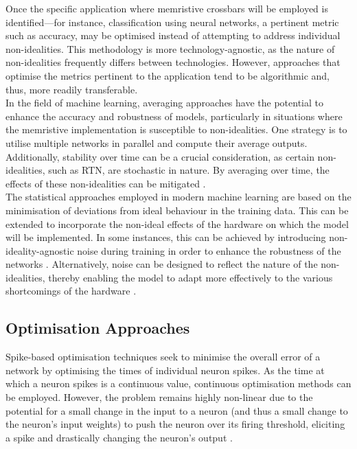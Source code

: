 \noindent Once the specific application where memristive crossbars will be employed is identified—for instance, classification using neural networks, a pertinent metric such as accuracy, may be optimised instead of attempting to address individual non-idealities. This methodology is more technology-agnostic, as the nature of non-idealities frequently differs between technologies. However, approaches that optimise the metrics pertinent to the application tend to be algorithmic and, thus, more readily transferable.\\

\noindent In the field of machine learning, averaging approaches have the potential to enhance the accuracy and robustness of models, particularly in situations where the memristive implementation is susceptible to non-idealities. One strategy is to utilise multiple networks in parallel and compute their average outputs. Additionally, stability over time can be a crucial consideration, as certain non-idealities, such as RTN, are stochastic in nature. By averaging over time, the effects of these non-idealities can be mitigated \cite{wan2020voltage}.\\

\noindent The statistical approaches employed in modern machine learning are based on the minimisation of deviations from ideal behaviour in the training data. This can be extended to incorporate the non-ideal effects of the hardware on which the model will be implemented. In some instances, this can be achieved by introducing non-ideality-agnostic noise during training in order to enhance the robustness of the networks \cite{ye2023improving}. Alternatively, noise can be designed to reflect the nature of the non-idealities, thereby enabling the model to adapt more effectively to the various shortcomings of the hardware \cite{huang2021method}.

\subsection[Optimisation Approaches]{Optimisation Approaches}

Spike-based optimisation techniques seek to minimise the overall error of a network by optimising the times of individual neuron spikes. As the time at which a neuron spikes is a continuous value, continuous optimisation methods can be employed. However, the problem remains highly non-linear due to the potential for a small change in the input to a neuron (and thus a small change to the neuron's input weights) to push the neuron over its firing threshold, eliciting a spike and drastically changing the neuron's output \cite{gutig2014spike}. \\

